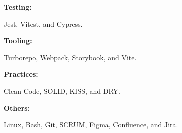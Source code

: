 \begin{minipage}[t]{0.47\textwidth}
    \begin{minipage}[t]{0.14\textwidth}
        \textbf{Testing:}
    \end{minipage}
    \hfill
    \begin{minipage}[t]{0.79\textwidth}
        Jest, Vitest, and Cypress.
    \end{minipage}
    \vspace{4pt}

    \begin{minipage}[t]{0.14\textwidth}
        \textbf{Tooling:}
    \end{minipage}
    \hfill
    \begin{minipage}[t]{0.79\textwidth}
        Turborepo, Webpack, Storybook, and Vite.
    \end{minipage}
    \vspace{4pt}

    \begin{minipage}[t]{0.14\textwidth}
        \textbf{Practices:}
    \end{minipage}
    \hfill
    \begin{minipage}[t]{0.79\textwidth}
        Clean Code, SOLID, KISS, and DRY\@.
    \end{minipage}
    \vspace{4pt}

    \begin{minipage}[t]{0.14\textwidth}
        \textbf{Others:}
    \end{minipage}
    \hfill
    \begin{minipage}[t]{0.79\textwidth}
        Linux, Bash, Git, SCRUM, Figma, Confluence, and Jira.
    \end{minipage}
    \vspace{4pt}

\end{minipage}
